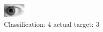 \begin{figure}[h!]
\begin{center}
\includegraphics[width=0.60\columnwidth]{figures/ID297_class_4_target_3.png}
\end{center}
\caption{ Classification: 4 actual target: 3}
\label{fig:ID297_class_4_target_3}
\end{figure}
